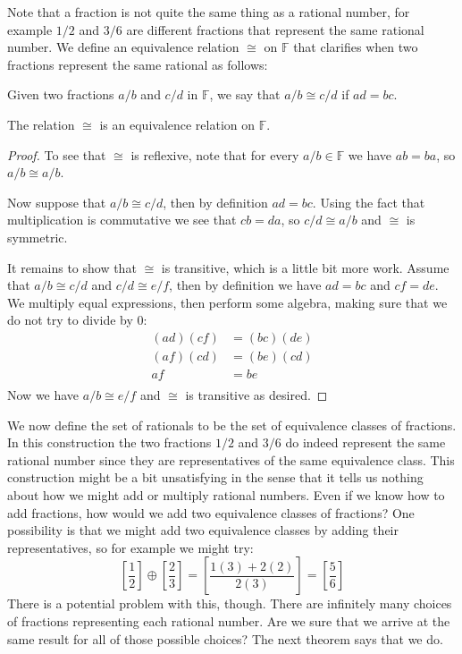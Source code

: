 Note that a fraction is not quite the same thing as a rational number, for example $1/2$ and $3/6$ are different fractions that represent the same rational number. We define an equivalence relation $\cong$  on $\mathbb F$ that clarifies when two fractions represent the same rational as follows:

\begin{definition}
Given two fractions $a/b$ and $c/d$ in $\mathbb F$, we say that $a/b\cong c/d$ if $ad=bc$.
\end{definition}

\begin{thrm}\label{thrm:rationals}
The relation $\cong$ is an equivalence relation on $\mathbb F$.
\end{thrm}

\begin{proof}
To see that $\cong$ is reflexive, note that for every $a/b\in\mathbb F$ we have $ab=ba$, so $a/b\cong a/b$.

Now suppose that $a/b\cong c/d$, then by definition $ad=bc$. Using the fact that multiplication is commutative we see that $cb=da$, so $c/d\cong a/b$ and $\cong$ is symmetric.

It remains to show that $\cong$ is transitive, which is a little bit more work. Assume that $a/b\cong c/d$ and $c/d\cong e/f$, then by definition we have $ad=bc$  and $cf=de$. We multiply equal expressions, then perform some algebra, making sure that we do not try to divide by $0$:
\begin{equation*}
\begin{split}
(ad)(cf)&=(bc)(de)\\
(af)(cd)&=(be)(cd)\\
af&=be\\
\end{split}
\end{equation*}
Now we have $a/b\cong e/f$ and $\cong$ is transitive as desired.
\end{proof}

We now define the set of rationals to be the set of equivalence classes of fractions. In this construction the two fractions $1/2$ and $3/6$ do indeed represent the same rational number since they are representatives of the same equivalence class. This construction might be a bit unsatisfying in the sense that it tells us nothing about how we might add or multiply rational numbers. Even if we know how to add fractions, how would we add two equivalence classes of fractions? One possibility is that we might add two equivalence classes by adding their representatives, so for example we might try: \[ \left[ \frac 12\right] \oplus \left[ \frac 23\right] =\left[ \frac{1(3)+2(2)}{2(3)}\right]=\left[ \frac 56\right] \] There is a potential problem with this, though. There are infinitely many choices of fractions representing each rational number. Are we sure that we arrive at the same result for all of those possible choices? The next theorem says that we do.

